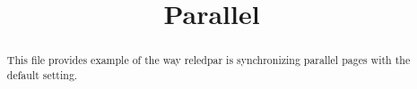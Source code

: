 \documentclass{article}
\begin{document}
\date{}
\title{Parallel}
\maketitle

\begin{abstract}
This file provides example of the way reledpar is synchronizing parallel pages with the default setting.
\end{abstract}



\begin{pages}
    \begin{Leftside}
        \beginnumbering
           \autopar
           \Blindtext[20][2]
        \endnumbering
    \end{Leftside}
    \begin{Rightside}
        \beginnumbering
            \autopar
           \Blindtext[20][3]
        \endnumbering
    \end{Rightside}

\end{pages} 
\Pages
\end{document}
